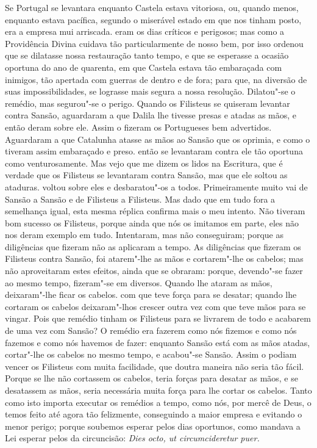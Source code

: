 Se Portugal se levantara enquanto Castela estava vitoriosa, ou, quando
menos, enquanto estava pacífica, segundo o miserável estado em que nos
tinham posto, era a empresa mui arriscada. eram os dias críticos e
perigosos; mas como a Providência Divina cuidava tão particularmente de
nosso bem, por isso ordenou que se dilatasse nossa restauração tanto
tempo, e que se esperasse a ocasião oportuna do ano de quarenta, em que
Castela estava tão embaraçada com inimigos, tão apertada com guerras de
dentro e de fora; para que, na diversão de suas
impossibilidades, se lograsse mais segura a nossa resolução. Dilatou"-se
o remédio, mas segurou"-se o perigo. Quando os Filisteus se quiseram
levantar contra Sansão, aguardaram a que Dalila lhe tivesse presas e
atadas as mãos, e então deram sobre ele. Assim o fizeram os Portugueses
bem advertidos. Aguardaram a que Catalunha atasse as mãos ao Sansão que
os oprimia, e como o tiveram assim embaraçado e preso. então se
levantaram contra ele tão oportuna como venturosamente.
Mas vejo que me dizem os lidos na Escritura, que é verdade que os
Filisteus se levantaram contra Sansão, mas que ele soltou as ataduras.
voltou sobre eles e desbaratou"-os a todos. Primeiramente muito vai de
Sansão a Sansão e de Filisteus a Filisteus. Mas dado que em tudo fora a
semelhança igual, esta mesma réplica confirma mais o meu intento. Não
tiveram bom sucesso os Filisteus, porque ainda que nós os imitamos em
parte, eles não nos deram exemplo em tudo. Intentaram, mas não
conseguiram; porque as diligências que fizeram não as aplicaram a tempo.
As diligências que fizeram os Filisteus contra Sansão, foi atarem"-lhe as
mãos e cortarem"-lhe os cabelos; mas não aproveitaram estes efeitos,
ainda que se obraram: porque, devendo"-se fazer ao mesmo tempo,
fizeram"-se em diversos. Quando lhe ataram as mãos, deixaram"-lhe ficar os
cabelos. com que teve força para se desatar; quando lhe cortaram os
cabelos deixaram"-lhos crescer outra vez com que teve mãos para se
vingar. Pois que remédio tinham os Filisteus para se livrarem de todo e
acabarem de uma vez com Sansão? O remédio era fazerem como nós
fizemos e como nós fazemos e como nós havemos de fazer: enquanto Sansão
está com as mãos atadas, cortar"-lhe os cabelos no mesmo tempo, e
acabou"-se Sansão. Assim o podiam vencer os Filisteus com muita
facilidade, que doutra maneira não seria tão fácil. Porque se lhe não
cortassem os cabelos, teria forças para desatar as mãos, e se desatassem
as mãos, seria necessária muita força para lhe cortar os cabelos. Tanto
como isto importa executar os remédios a tempo, como nós, por mercê de
Deus, o temos feito até agora tão felizmente, conseguindo a maior
empresa e evitando o menor perigo; porque soubemos esperar pelos dias
oportunos, como mandava a Lei esperar pelos da circuncisão: \emph{Dies
octo, ut circumcideretur puer.}

